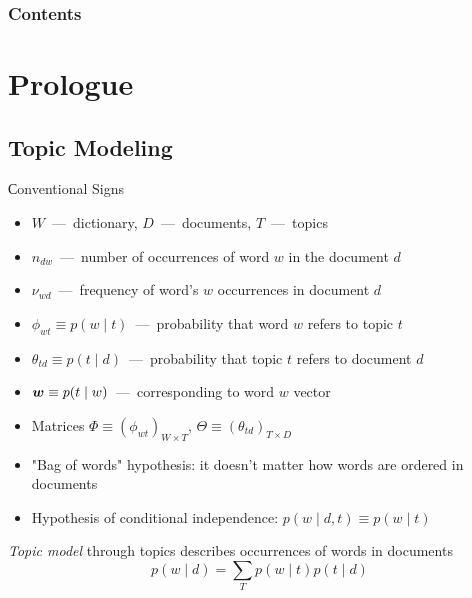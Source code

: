 \documentclass[russian]{beamer}
\begin{document}
\begin{frame}
  \frametitle{Contents}
  \tableofcontents
\end{frame}


\section{Prologue}


\subsection{Topic Modeling}


\begin{frame}{Сonventional Signs}
  \begin{itemize}
    \item $W$~---~dictionary, $D$~---~documents, $T$~---~topics
    \item $n_{dw}$~---~number of occurrences of word $w$ in the document $d$
    \item $\nu_{wd}$~---~frequency of word's $w$ occurrences in document $d$
    \item $\phi_{wt} \equiv p(w \mid t)$~---~probability that word $w$ refers to topic $t$ %
    \item $\theta_{td} \equiv p(t \mid d)$~---~probability that topic $t$ refers to document $d$
    \item $\boldsymbol w \equiv p(t \mid w)$~---~corresponding to word $w$ vector
    \item Matrices $\Phi \equiv (\phi_{wt})_{W \times T}$, $\Theta \equiv (\theta_{td})_{T \times D}$
    \item "Bag of words" hypothesis: it doesn't matter how words are ordered in documents
    \item Hypothesis of conditional independence: $p(w \mid d, t) \equiv p(w \mid t)$
  \end{itemize}
  
  \emph{Topic model} through topics describes occurrences of words in documents
  \[
     p(w \mid d) = \sum\limits_{T} p(w \mid t) p(t \mid d)
  \]
\end{frame}
\end{document}
